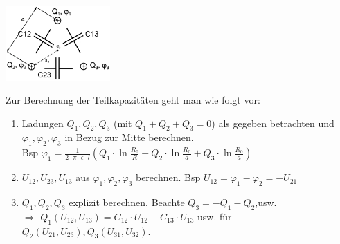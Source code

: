 \parbox{5cm}{\includegraphics[width=4cm]{./bilder/e-c-teilkapazitaeten.png}}
\parbox{13cm}{
	Zur Berechnung der Teilkapazitäten geht man wie folgt vor:
	\begin{enumerate}
    	\item Ladungen $Q_1, Q_2, Q_3$ (mit $Q_1 + Q_2 + Q_3 = 0$) als gegeben betrachten 	
		und $\varphi_1, \varphi_2, \varphi_3$ in Bezug zur Mitte berechnen.\\ Bsp $\varphi_1 
		= \frac{1}{2\cdot \pi \cdot \epsilon\cdot l}(Q_1 \cdot \ln{\frac{R_0}{R}}+Q_2 \cdot \ln{\frac{R_0}{a}}+Q_3 
		\cdot \ln{\frac{R_0}{a}})$
    	\item $U_{12}, U_{23}, U_{13}$ aus $\varphi_1, \varphi_2, \varphi_3$ berechnen. Bsp 
		$U_{12} = \varphi_1 - \varphi_2 = -U_{21}$
    	\item $Q_1, Q_2, Q_3$ explizit berechnen. Beachte $Q_3 = -Q_1 - Q_2$,usw. \\$\Rightarrow$ $Q_1(U_{12},U_{13}) = C_{12} \cdot U_{12} + C_{13} \cdot U_{13}$ usw. für $Q_2(U_{21},U_{23}), Q_3(U_{31},U_{32})$.
  \end{enumerate} } 
 
